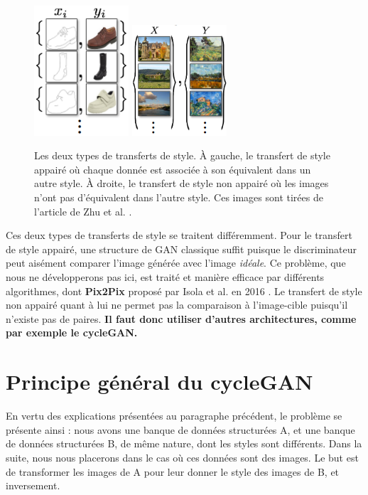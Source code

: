 \begin{figure}[!h]
\centering
\includegraphics[width=100pt,valign=t]{"images/cycle/paire"}
\hspace*{10mm}
\includegraphics[width=100pt,valign=t]{"images/cycle/pairepas"}
\caption{Les deux types de transferts de style. À gauche, le transfert de style appairé où chaque donnée est associée à son équivalent dans un autre style. À droite, le transfert de style non appairé où les images n'ont pas d'équivalent dans l'autre style. Ces images sont tirées de l'article de Zhu et al. \cite{zhu_unpaired_2018}.}
\label{paire}
\end{figure}

Ces deux types de transferts de style se traitent différemment. Pour le transfert de style appairé, une structure de GAN classique suffit puisque le discriminateur peut aisément comparer l'image générée avec l'image \textit{idéale}. Ce problème, que nous ne développerons pas ici, est traité et manière efficace par différents algorithmes, dont \textbf{Pix2Pix} proposé par Isola et al. en 2016 \cite{isola_image--image_2018}. Le transfert de style non appairé quant à lui ne permet pas la comparaison à l'image-cible puisqu'il n'existe pas de paires. \textbf{Il faut donc utiliser d'autres architectures, comme par exemple le cycleGAN.}


\section{Principe général du cycleGAN}

En vertu des explications présentées au paragraphe précédent, le problème se présente ainsi : nous avons une banque de données structurées A, et une banque de données structurées B, de même nature, dont les styles sont différents. Dans la suite, nous nous placerons dans le cas où ces données sont des images. Le but est de transformer les images de A pour leur donner le style des images de B, et inversement.

